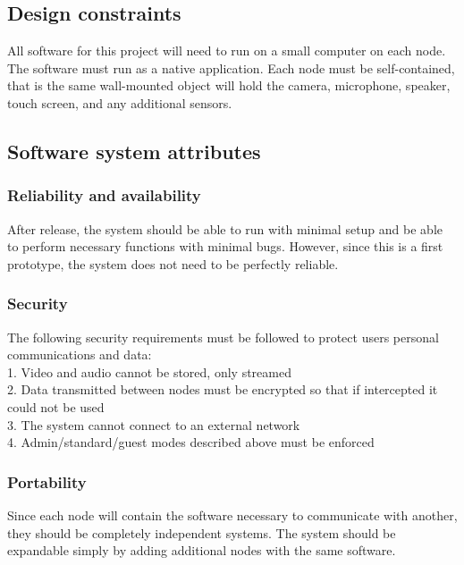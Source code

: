 \documentclass[onecolumn, draftclsnofoot,10pt, compsoc]{IEEEtran}
\begin{document}
\subsection{Design constraints}
All software for this project will need to run on a small computer on each node. The software must run as a native application. Each node must be self-contained, that is the same wall-mounted object will hold the camera, microphone, speaker, touch screen, and any additional sensors.

\subsection{Software system attributes}

\subsubsection{Reliability and availability}
After release, the system should be able to run with minimal setup and be able to perform necessary functions with minimal bugs. However, since this is a first prototype, the system does not need to be perfectly reliable.

\subsubsection{Security}
The following security requirements must be followed to protect users personal communications and data: \\
1. Video and audio cannot be stored, only streamed \\
2. Data transmitted between nodes must be encrypted so that if intercepted it could not be used \\
3. The system cannot connect to an external network \\
4. Admin/standard/guest modes described above must be enforced

\subsubsection{Portability}
Since each node will contain the software necessary to communicate with another, they should be completely independent systems. The system should be expandable simply by adding additional nodes with the same software. 
\end{document}
